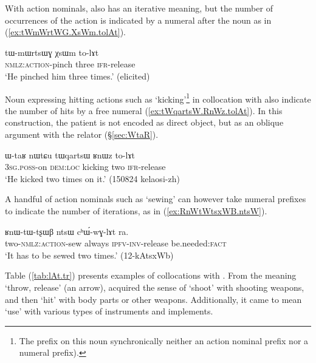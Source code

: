 With  action nominals,  also has an iterative meaning, but the number of occurrences of the action is indicated by a numeral after the noun as in (\ref{ex:tWmWrtWG.XsWm.tolAt}).

\begin{exe}
\ex \label{ex:tWmWrtWG.XsWm.tolAt}
\gll tɯ-mɯrtsɯɣ χsɯm to-lɤt \\
\textsc{nmlz}:\textsc{action}-pinch three \textsc{ifr}-release \\
\glt `He pinched him three times.' (elicited)
\end{exe}

Noun expressing hitting actions such as  `kicking'\footnote{The  prefix on this noun synchronically neither an action nominal prefix nor a numeral prefix). } in collocation with  also indicate the number of hits by a free numeral (\ref{ex:tWqartsW.RnWz.tolAt}). In this construction, the patient is not encoded as direct object, but as an oblique argument with the relator  (§\ref{sec:WtaR}).

\begin{exe}
\ex \label{ex:tWqartsW.RnWz.tolAt}
\gll ɯ-taʁ nɯtɕu tɯqartsɯ ʁnɯz to-lɤt \\
\textsc{3sg}.\textsc{poss}-on \textsc{dem}:\textsc{loc} kicking two \textsc{ifr}-release \\
\glt `He kicked two times on it.'  (150824 kelaosi-zh)
\end{exe}

A handful of action nominals such as  `sewing' can however take numeral prefixes to indicate the number of iterations, as in (\ref{ex:RnWtWtsxWB.ntsW}).
 
\begin{exe}
\ex \label{ex:RnWtWtsxWB.ntsW}
\gll ʁnɯ-tɯ-tʂɯβ ntsɯ cʰɯ́-wɣ-lɤt ra.   \\
two-\textsc{nmlz}:\textsc{action}-sew always \textsc{ipfv}-\textsc{inv}-release be.needed:\textsc{fact} \\
\glt `It has to be sewed two times.' (12-kAtsxWb)
\end{exe}
 
Table (\ref{tab:lAt.tr}) presents examples of collocations with . From the meaning `throw, release' (an arrow),  acquired the sense of `shoot' with shooting weapons, and then `hit' with body parts or other weapons. Additionally, it came to mean `use' with various types of instruments and implements.
 
